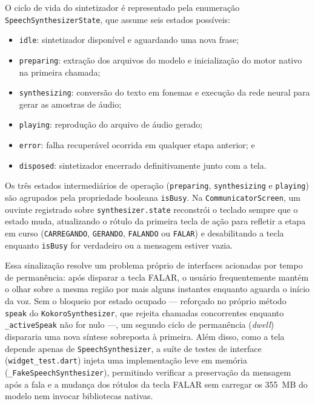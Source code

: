 O ciclo de vida do sintetizador é representado pela enumeração \texttt{Speech\allowbreak Synthesizer\allowbreak State}, que assume seis estados possíveis:
\begin{itemize}
    \item \texttt{idle}: sintetizador disponível e aguardando uma nova frase;
    \item \texttt{preparing}: extração dos arquivos do modelo e inicialização do motor nativo na primeira chamada;
    \item \texttt{synthesizing}: conversão do texto em fonemas e execução da rede neural para gerar as amostras de áudio;
    \item \texttt{playing}: reprodução do arquivo de áudio gerado;
    \item \texttt{error}: falha recuperável ocorrida em qualquer etapa anterior; e
    \item \texttt{disposed}: sintetizador encerrado definitivamente junto com a tela.
\end{itemize}
Os três estados intermediários de operação (\texttt{preparing}, \texttt{synthesizing} e \texttt{playing}) são agrupados pela propriedade booleana \texttt{isBusy}. Na \texttt{CommunicatorScreen}, um ouvinte registrado sobre \texttt{synthesizer.state} reconstrói o teclado sempre que o estado muda, atualizando o rótulo da primeira tecla de ação para refletir a etapa em curso (\texttt{CARREGANDO}, \texttt{GERANDO}, \texttt{FALANDO} ou \texttt{FALAR}) e desabilitando a tecla enquanto \texttt{isBusy} for verdadeiro ou a mensagem estiver vazia.

Essa sinalização resolve um problema próprio de interfaces acionadas por tempo de permanência: após disparar a tecla FALAR, o usuário frequentemente mantém o olhar sobre a mesma região por mais alguns instantes enquanto aguarda o início da voz. Sem o bloqueio por estado ocupado --- reforçado no próprio método \texttt{speak} do \texttt{KokoroSynthesizer}, que rejeita chamadas concorrentes enquanto \texttt{\_activeSpeak} não for nulo ---, um segundo ciclo de permanência (\textit{dwell}) dispararia uma nova síntese sobreposta à primeira. Além disso, como a tela depende apenas de \texttt{SpeechSynthesizer}, a suíte de testes de interface (\texttt{widget\_test.dart}) injeta uma implementação leve em memória (\texttt{\_Fake\allowbreak Speech\allowbreak Synthesizer}), permitindo verificar a preservação da mensagem após a fala e a mudança dos rótulos da tecla FALAR sem carregar os 355~MB do modelo nem invocar bibliotecas nativas.

